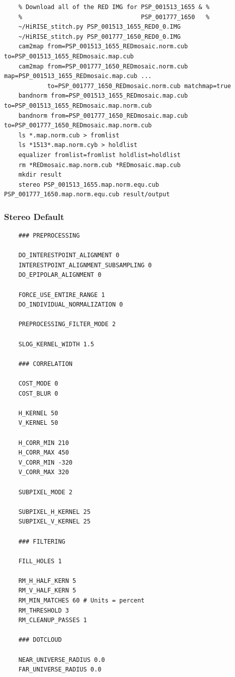 \begin{verbatim}
    % Download all of the RED IMG for PSP_001513_1655 & %
    %                                 PSP_001777_1650   %
    ~/HiRISE_stitch.py PSP_001513_1655_RED0_0.IMG
    ~/HiRISE_stitch.py PSP_001777_1650_RED0_0.IMG
    cam2map from=PSP_001513_1655_REDmosaic.norm.cub to=PSP_001513_1655_REDmosaic.map.cub
    cam2map from=PSP_001777_1650_REDmosaic.norm.cub map=PSP_001513_1655_REDmosaic.map.cub ...
            to=PSP_001777_1650_REDmosaic.norm.cub matchmap=true
    bandnorm from=PSP_001513_1655_REDmosaic.map.cub to=PSP_001513_1655_REDmosaic.map.norm.cub
    bandnorm from=PSP_001777_1650_REDmosaic.map.cub to=PSP_001777_1650_REDmosaic.map.norm.cub
    ls *.map.norm.cub > fromlist
    ls *1513*.map.norm.cyb > holdlist
    equalizer fromlist=fromlist holdlist=holdlist
    rm *REDmosaic.map.norm.cub *REDmosaic.map.cub
    mkdir result
    stereo PSP_001513_1655.map.norm.equ.cub PSP_001777_1650.map.norm.equ.cub result/output
\end{verbatim}

\subsubsection*{Stereo Default}

\begin{verbatim}
    ### PREPROCESSING

    DO_INTERESTPOINT_ALIGNMENT 0
    INTERESTPOINT_ALIGNMENT_SUBSAMPLING 0
    DO_EPIPOLAR_ALIGNMENT 0

    FORCE_USE_ENTIRE_RANGE 1
    DO_INDIVIDUAL_NORMALIZATION 0

    PREPROCESSING_FILTER_MODE 2

    SLOG_KERNEL_WIDTH 1.5

    ### CORRELATION

    COST_MODE 0
    COST_BLUR 0

    H_KERNEL 50
    V_KERNEL 50

    H_CORR_MIN 210
    H_CORR_MAX 450
    V_CORR_MIN -320
    V_CORR_MAX 320

    SUBPIXEL_MODE 2

    SUBPIXEL_H_KERNEL 25
    SUBPIXEL_V_KERNEL 25

    ### FILTERING

    FILL_HOLES 1

    RM_H_HALF_KERN 5
    RM_V_HALF_KERN 5
    RM_MIN_MATCHES 60 # Units = percent
    RM_THRESHOLD 3
    RM_CLEANUP_PASSES 1

    ### DOTCLOUD

    NEAR_UNIVERSE_RADIUS 0.0
    FAR_UNIVERSE_RADIUS 0.0
\end{verbatim}

